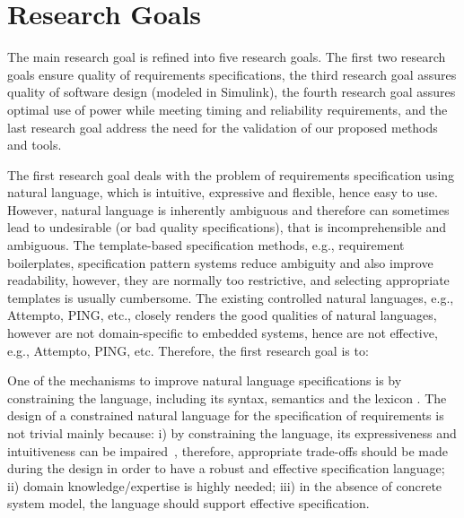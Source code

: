 \section{Research Goals}\label{research_challenges}
The main research goal is refined into five research goals. The first two research goals ensure quality of requirements specifications, the third research goal assures quality of software design (modeled in Simulink), the fourth research goal assures optimal use of power while meeting timing and reliability requirements, and the last research goal address the need for the validation of our proposed methods and tools.

The first research goal deals with the problem of requirements specification using natural language, which is intuitive, expressive and flexible, hence easy to use. However, natural language is inherently ambiguous and therefore can sometimes lead to undesirable (or bad quality specifications), that is incomprehensible and ambiguous. The template-based specification methods, e.g., requirement boilerplates, specification pattern systems reduce ambiguity and also improve readability, however, they are normally too restrictive, and selecting appropriate templates is usually cumbersome. The existing controlled natural languages, e.g., Attempto, PING, etc., closely renders the good qualities of natural languages, however are not domain-specific to embedded systems, hence are not effective, e.g., Attempto, PING, etc. Therefore, the first research goal is to:
\setcounter{rgcounter}{1}
\begin{researchgoal}
\end{researchgoal}

One of the mechanisms to improve natural language specifications is by constraining the language, including its syntax, semantics and the lexicon \cite{Kuhn2014ALanguages}. The design of a constrained natural language for the specification of requirements is not trivial mainly because: i) by constraining the language, its expressiveness and intuitiveness can be impaired~\cite{ieereqspecstandard}\cite{Myachykov2013SyntacticRussian}, therefore, appropriate trade-offs should be made during the design in order to have a robust and effective specification language; ii) domain knowledge/expertise is highly needed; iii) in the absence of concrete system model, the language should support effective specification.

